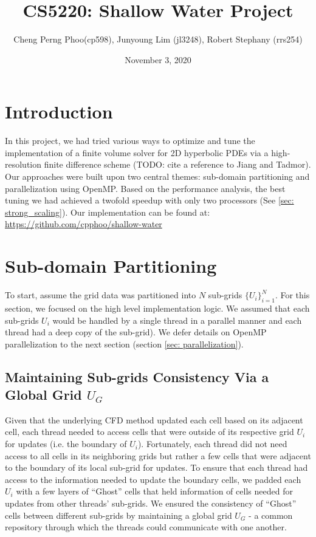 \documentclass{article}
\title{CS5220: Shallow Water Project}
\author{Cheng Perng Phoo(cp598), Junyoung Lim (jl3248), Robert Stephany (rrs254)}
\date{November 3, 2020}
\begin{document}
\maketitle

\section{Introduction}

In this project, we had tried various ways to optimize and tune the implementation of a finite volume solver for 2D hyperbolic PDEs via a high-resolution finite difference scheme (TODO: cite a reference to Jiang and Tadmor). 
Our approaches were built upon two central themes: sub-domain partitioning and parallelization using OpenMP. 
Based on the performance analysis, the best tuning we had achieved a twofold speedup with only two processors (See \ref{sec: strong_scaling}). Our implementation can be found at: \url{https://github.com/cpphoo/shallow-water}

\section{Sub-domain Partitioning}
\label{sec: subdomain_partitioning}
To start, assume the grid data was partitioned into $N$ sub-grids $\{U_i\}_{i=1}^N$.
For this section, we focused on the high level implementation logic. We assumed 
that each sub-grids $U_i$ would be handled by a single thread in a parallel manner and 
each thread had a deep copy of the sub-grid). 
We defer details on OpenMP parallelization to the next section (section \ref{sec: parallelization}). 

\subsection{Maintaining Sub-grids Consistency Via a Global Grid $U_G$}

Given that the underlying CFD method updated each cell based on its adjacent cell, each thread needed to access cells that were outside of its respective grid $U_i$ for updates (i.e. the boundary of $U_i$). 
Fortunately, each thread did not need access to all cells in its neighboring grids but rather a few cells that were adjacent to the boundary of its local sub-grid for updates.
To ensure that each thread had access to the information needed to update the boundary cells, we padded each $U_i$ with a few layers of ``Ghost'' cells that held information of cells 
needed for updates from other threads' sub-grids. We ensured the consistency of ``Ghost'' cells between different sub-grids by maintaining a global grid $U_G$ - a common repository 
through which the threads could communicate with one another.
\end{document}
